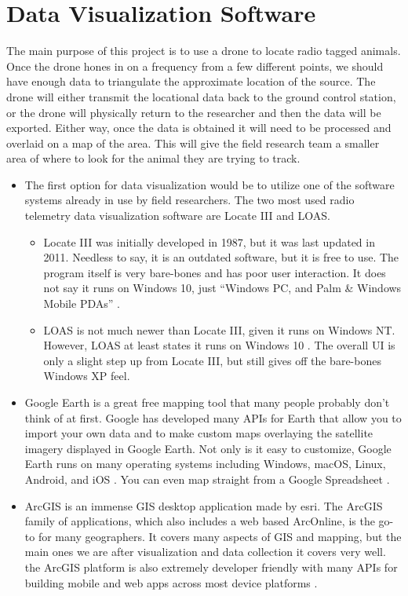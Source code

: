 \documentclass[onecolumn, 10pt, compsoc]{IEEEtran}
\begin{document}
\section{Data Visualization Software}
The main purpose of this project is to use a drone to locate radio tagged animals. Once the drone hones in on a frequency from a few different points, we should have enough data to triangulate the approximate location of the source. The drone will either transmit the locational data back to the ground control station, or the drone will physically return to the researcher and then the data will be exported. Either way, once the data is obtained it will need to be processed and overlaid on a map of the area. This will give the field research team a smaller area of where to look for the animal they are trying to track.

\begin{itemize}
    \item The first option for data visualization would be to utilize one of the software systems already in use by field researchers. The two most used radio telemetry data visualization software are Locate III and LOAS. 
    \begin{itemize}
        \item Locate III was initially developed in 1987, but it was last updated in 2011. Needless to say, it is an outdated software, but it is free to use. The program itself is very bare-bones and has poor user interaction. It does not say it runs on Windows 10, just “Windows PC, and Palm \& Windows Mobile PDAs” \cite{LocateIII}.
        \item LOAS is not much newer than Locate III, given it runs on Windows NT. However, LOAS at least states it runs on Windows 10 \cite{LOAS}. The overall UI is only a slight step up from Locate III, but still gives off the bare-bones Windows XP feel.
    \end{itemize}
    \item Google Earth is a great free mapping tool that many people probably don’t think of at first. Google has developed many APIs for Earth that allow you to import your own data and to make custom maps overlaying the satellite imagery displayed in Google Earth. Not only is it easy to customize, Google Earth runs on many operating systems including Windows, macOS, Linux, Android, and iOS \cite{GoogleEarth}. You can even map straight from a Google Spreadsheet \cite{GoogleEarthMappingSpreadsheet}.
    \item ArcGIS is an immense GIS desktop application made by esri. The ArcGIS family of applications, which also includes a web based ArcOnline, is the go-to for many geographers. It covers many aspects of GIS and mapping, but the main ones we are after visualization and data collection it covers very well. the ArcGIS platform is also extremely developer friendly with many APIs for building mobile and web apps across most device platforms \cite{ArcGIS}.
\end{itemize}
\end{document}
